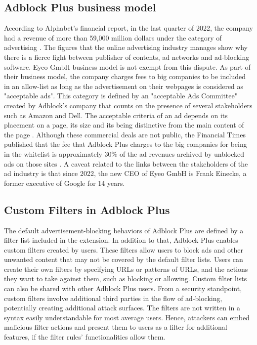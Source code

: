 \documentclass[conference]{IEEEtran}
\begin{document}
\subsection{Adblock Plus business model}
According to Alphabet's financial report, in the last quarter of 2022, the company had a revenue of more than 59,000 million dollars under the category of advertising \cite{alphabet_revenue}. The figures that the online advertising industry manages show why there is a fierce fight between publisher of contents, ad networks and ad-blocking software. Eyeo GmbH business model is not exempt from this dispute. As part of their business model, the company charges fees to big companies to be included in an allow-list as long as the advertisement on their webpages is considered as "acceptable ads". This category is defined by an "acceptable Ads Committee" created by Adblock's company that counts on the presence of several stakeholders such as Amazon and Dell. The acceptable criteria of an ad depends on its placement on a page, its size and its being distinctive from the main content of the page \cite{acceptable_ads}. Although these commercial deals are not public, the Financial Times published that the fee that Adblock Plus charges to the big companies for being in the whitelist is approximately 30\% of the ad revenues archived by unblocked ads on those sites \cite{financial_times}. 
A caveat related to the links between the stakeholders of the ad industry is that since 2022, the new CEO of Eyeo GmbH is Frank Einecke, a former executive of Google for 14 years.


\subsection{Custom Filters in Adblock Plus}
The default advertisement-blocking behaviors of Adblock Plus are defined by a filter list included in the extension. In addition to that, Adblock Plus enables custom filters created by users. These filters allow users to block ads and other unwanted content that may not be covered by the default filter lists. Users can create their own filters by specifying URLs or patterns of URLs, and the actions they want to take against them, such as blocking or allowing. Custom filter lists can also be shared with other Adblock Plus users. From a security standpoint, custom filters involve additional third parties in the flow of ad-blocking, potentially creating additional attack surfaces. The filters are not written in a syntax easily understandable for most average users. Hence, attackers can embed malicious filter actions and present them to users as a filter for additional features, if the filter rules' functionalities allow them.
\end{document}
